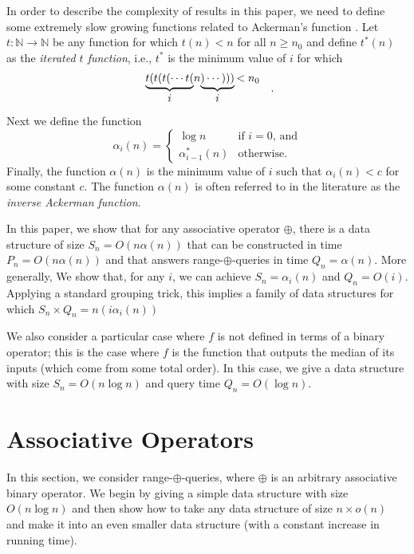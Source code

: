 \documentclass[lotsofwhite]{patmorin}
\begin{document}
In order to describe the complexity of results in this paper, we need
to define some extremely slow growing functions related to Ackerman's
function \cite{X}. Let $t:\mathbb{N}\rightarrow\mathbb{N}$ be any
function for which $t(n)<n$ for all $n\ge n_0$ and define $t^*(n)$ as
the \emph{iterated $t$ function}, i.e., $t^*$ is the minimum value of
$i$ for which
\[  \begin{array}{c@{}c@{}c@{\,}c}\underbrace{t(t(t(\cdots t(}&n&\underbrace{)\cdots)))}&<n_0 \\
  i& &i\end{array} \enspace .
\]
Next we define the function 
\[
  \alpha_i(n) = \left\{\begin{array}{ll}
  \log n & \mbox{if $i=0$, and} \\
  \alpha_{i-1}^*(n) & \mbox{otherwise.} \end{array}\right.
\]
Finally, the function $\alpha(n)$ is the minimum value of $i$ such
that $\alpha_i(n)<c$ for some constant $c$.  The function $\alpha(n)$
is often referred to in the literature as the \emph{inverse Ackerman
function}.

In this paper, we show that for any associative operator $\oplus$,
there is a data structure of size $S_n=O(n\alpha(n))$ that can be
constructed in time $P_n=O(n\alpha(n))$ and that answers
range-$\oplus$-queries in time $Q_n=\alpha(n)$.  More generally, We
show that, for any $i$, we can achieve $S_n=\alpha_i(n)$ and
$Q_n=O(i)$.  Applying a standard grouping trick, this implies a family
of data structures for which $S_n\times Q_n=n(i\alpha_i(n))$

We also consider a particular case where $f$ is not defined in terms
of a binary operator; this is the case where $f$ is the function that
outputs the median of its inputs (which come from some total order).
In this case, we give a data structure with size $S_n=O(n\log n)$
and query time $Q_n=O(\log n)$.

\section{Associative Operators}

In this section, we consider range-$\oplus$-queries, where $\oplus$ is
an arbitrary associative binary operator.  We begin by giving a simple
data structure with size $O(n\log n)$ and then show how to take any
data structure of size $n\times o(n)$ and make it into an even smaller
data structure (with a constant increase in running time).
\end{document}

